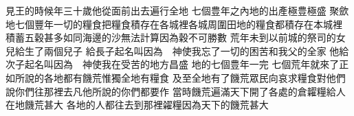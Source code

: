 見王的時候\chientien 年三十歲\yuentien 他從面前出去遍行全地\chuan 
{}七個豊年之內\chientien 地的出產極豊極盛\chuan{}
聚歛地七個豐年一切的糧食\chientien 把糧食積存在各城裡\chientien 各城周圍田地的糧食\chientien 都積存在本城裡\chuan 
{}積蓄五穀甚多\chientien 如同海邊的沙\chientien 無法計算\chientien 因為穀不可勝數\chuan 
{}荒年未到以前\chientien{}城的祭司的女兒給生了兩個兒子\yuentien 
{}給長子起名叫\chientien{}因為\chientien 　神使我忘了一切的困苦\chientien 和我父的全家\chuan 
{}他給次子起名叫\chientien{}因為\chientien 　神使我在受苦的地方昌盛\chuan 
{}地的七個豊年一完\chientien 
{}七個荒年就來了\chientien 正如所說的\yuentien 各地都有饑荒\chientien 惟獨全地有糧食\chuan 
{}及至全地有了饑荒\chientien 眾民向哀求糧食\chientien{}對他們說\chientien 你們往那裡去\chientien 凡他所說的你們都要作\chuan 
{}當時饑荒遍滿天下\chientien{}開了各處的倉\chientien 糶糧給人\yuentien 在地饑荒甚大\chuan 
{}各地的人都往去\chientien 到那裡糴糧\chientien 因為天下的饑荒甚大\chuan 
